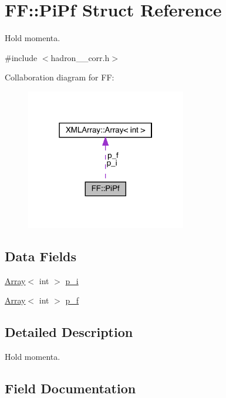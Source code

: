 \hypertarget{structFF_1_1PiPf}{}\section{FF\+:\+:Pi\+Pf Struct Reference}
\label{structFF_1_1PiPf}


Hold momenta.  




{\ttfamily \#include $<$hadron\+\_\+3pt\+\_\+corr.\+h$>$}



Collaboration diagram for FF\+:\nopagebreak
\begin{figure}[H]
\begin{center}
\leavevmode
\includegraphics[width=198pt]{d9/d56/structFF_1_1PiPf__coll__graph}
\end{center}
\end{figure}
\subsection*{Data Fields}
\begin{DoxyCompactItemize}
\item 
\mbox{\hyperlink{classXMLArray_1_1Array}{Array}}$<$ int $>$ \mbox{\hyperlink{structFF_1_1PiPf_a740b500d8919567a75f3b1d1cb83241f}{p\+\_\+i}}
\item 
\mbox{\hyperlink{classXMLArray_1_1Array}{Array}}$<$ int $>$ \mbox{\hyperlink{structFF_1_1PiPf_a82ba1f82eba420a5efd5806327a02024}{p\+\_\+f}}
\end{DoxyCompactItemize}


\subsection{Detailed Description}
Hold momenta. 

\subsection{Field Documentation}
\mbox{\label{structFF_1_1PiPf_a82ba1f82eba420a5efd5806327a02024}} 
